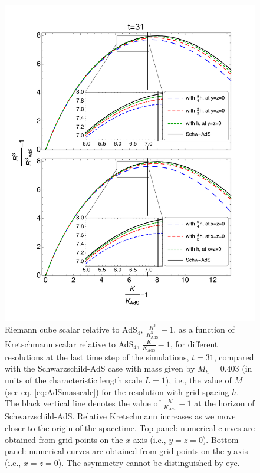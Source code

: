 \documentclass[a4paper,11pt]{article}
\numberwithin{equation}{section}
\begin{document}
\begin{figure}[!h]
        \centering
        \includegraphics[width=5.25in,clip=true]{plots/bulkplots/compare_res/relriemanncube-relkretsch/combined_withzoom_fullplotrelRieCubeofrelkretschallres.pdf}
\parbox{5.0in}{\caption{Riemann cube scalar relative to AdS$_4$, $\frac{R^3}{R^3_{\text{AdS}}}-1$, as a function of Kretschmann scalar relative to AdS$_4$, $\frac{K}{K_{\text{AdS}}}-1$, for different resolutions at the last time step of the simulations, $t=31$, compared with the Schwarzschild-AdS case with mass given by $M_h=0.403$ (in units of the characteristic length scale $L=1$), i.e., the value of $M$ (see eq. \eqref{eq:AdSmasscalc}) for the resolution with grid spacing $h$. The black vertical line denotes the value of $\frac{K}{K_{AdS}}-1$ at the horizon of Schwarzschild-AdS. Relative Kretschmann increases as we move closer to the origin of the spacetime. Top panel: numerical curves are obtained from grid points on the $x$ axis (i.e., $y=z=0$). Bottom panel: numerical curves are obtained from grid points on the $y$ axis (i.e., $x=z=0$). The asymmetry cannot be distinguished by eye.
        }\label{fig:relRiemanncube-relKretschmann-comparison-SchwAdS}}
\end{figure}
\end{document}
